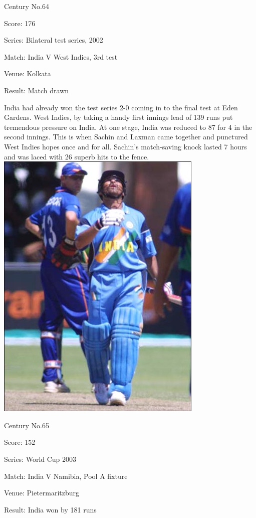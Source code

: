 \documentclass[11pt, a4paper]{article}
\begin{document}
Century No.64 

Score: 176 

Series: Bilateral test series, 2002 

Match: India V West Indies, 3rd test 

Venue: Kolkata 

Result: Match drawn 

India had already won the test series 2-0 coming in to the final test at Eden Gardens. West Indies, by taking a handy first innings lead of 139 runs put tremendous pressure on India. At one stage, India was reduced to 87 for 4 in the second innings. This is when Sachin and Laxman came together and punctured West Indies hopes once and for all. Sachin's match-saving knock lasted 7 hours and was laced with 26 superb hits to the fence.
\newpage
\includegraphics[height=0.75\textheight]{pics/65.jpg}

Century No.65 

Score: 152 

Series: World Cup 2003 

Match: India V Namibia, Pool A fixture 

Venue: Pietermaritzburg 

Result: India won by 181 runs 
\end{document}
